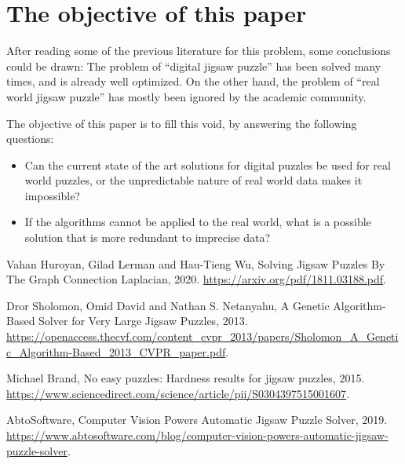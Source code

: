 \documentclass{article}
\begin{document}
\section{The objective of this paper}
After reading some of the previous literature for this problem, some conclusions could be drawn:
The problem of “digital jigsaw puzzle” has been solved many times, and is already well optimized.\newline
On the other hand, the problem of “real world jigsaw puzzle” has mostly been ignored\newline
by the academic community.\newline

The objective of this paper is to fill this void, by answering the following questions:
\begin{itemize}
    \item Can the current state of the art solutions for digital puzzles be used for real world puzzles, or the unpredictable nature of real world data makes it impossible?
    \item If the algorithms cannot be applied to the real world, what is a possible solution that is more redundant to imprecise data?

  \end{itemize}


\newpage
\begin{thebibliography}{9}

    Vahan Huroyan, Gilad   Lerman and Hau-Tieng Wu,
    Solving Jigsaw Puzzles By The Graph Connection Laplacian,
    2020.
    \url{https://arxiv.org/pdf/1811.03188.pdf}.
  
    Dror Sholomon, Omid David and Nathan S. Netanyahu,
    A Genetic Algorithm-Based Solver for Very Large Jigsaw Puzzles,
    2013.
    \url{https://openaccess.thecvf.com/content_cvpr_2013/papers/Sholomon_A_Genetic_Algorithm-Based_2013_CVPR_paper.pdf}.
  
    Michael Brand,
    No easy puzzles: Hardness results for jigsaw puzzles,
    2015.
    \url{https://www.sciencedirect.com/science/article/pii/S0304397515001607}.

    AbtoSoftware,
    Computer Vision Powers Automatic Jigsaw Puzzle Solver,
    2019.
    \url{https://www.abtosoftware.com/blog/computer-vision-powers-automatic-jigsaw-puzzle-solver}.
  
\end{thebibliography}
\end{document}
